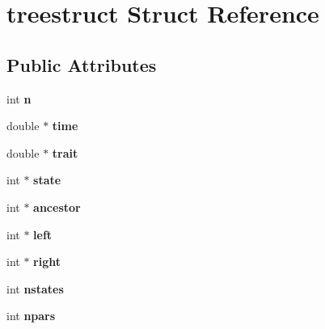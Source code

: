 \hypertarget{structtreestruct}{
\section{treestruct Struct Reference}
\label{structtreestruct}
}
\subsection*{Public Attributes}
\begin{DoxyCompactItemize}
\item 
\hypertarget{structtreestruct_a932136cebe49dcb83978b718c7a4102a}{
int {\bfseries n}}
\label{structtreestruct_a932136cebe49dcb83978b718c7a4102a}

\item 
\hypertarget{structtreestruct_a6f073815b944061a6a4f0486f985d4e9}{
double $\ast$ {\bfseries time}}
\label{structtreestruct_a6f073815b944061a6a4f0486f985d4e9}

\item 
\hypertarget{structtreestruct_acb990c7c4b1691545274ba60ee66cad7}{
double $\ast$ {\bfseries trait}}
\label{structtreestruct_acb990c7c4b1691545274ba60ee66cad7}

\item 
\hypertarget{structtreestruct_a602e64a8deaf35ce444f63a17ea41d96}{
int $\ast$ {\bfseries state}}
\label{structtreestruct_a602e64a8deaf35ce444f63a17ea41d96}

\item 
\hypertarget{structtreestruct_a05268320baf38203a91341a0ca7859c7}{
int $\ast$ {\bfseries ancestor}}
\label{structtreestruct_a05268320baf38203a91341a0ca7859c7}

\item 
\hypertarget{structtreestruct_aafa1d616cea52b4c42f447ba43c5d99d}{
int $\ast$ {\bfseries left}}
\label{structtreestruct_aafa1d616cea52b4c42f447ba43c5d99d}

\item 
\hypertarget{structtreestruct_a2a73fba40c9a9983fbf10e4060999804}{
int $\ast$ {\bfseries right}}
\label{structtreestruct_a2a73fba40c9a9983fbf10e4060999804}

\item 
\hypertarget{structtreestruct_a00bdbc9148dc6511759adb13e41a49d3}{
int {\bfseries nstates}}
\label{structtreestruct_a00bdbc9148dc6511759adb13e41a49d3}

\item 
\hypertarget{structtreestruct_a01c88e519b9a75522cd9fef227d4226d}{
int {\bfseries npars}}
\label{structtreestruct_a01c88e519b9a75522cd9fef227d4226d}


\end{DoxyCompactItemize}
